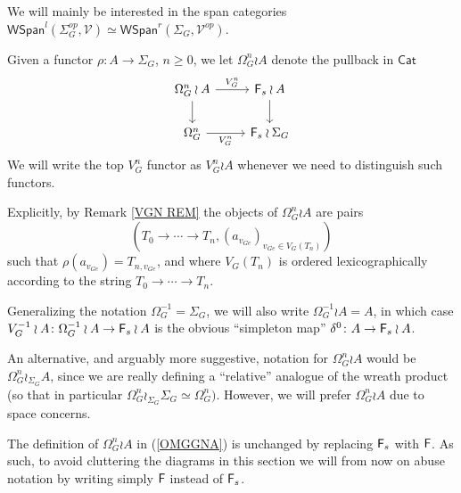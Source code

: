 \documentclass[a4paper,10pt]{article}%
\begin{document}
We will mainly be interested in the span categories 
$\mathsf{WSpan}^l(\Sigma_G^{op},\mathcal{V})\simeq 
\mathsf{WSpan}^r(\Sigma_G,\mathcal{V}^{op})$.


\begin{notation}\label{OMEGAGNA NOT}
	Given a functor $\rho \colon A \to \Sigma_G$, $n \geq 0$, we let $\Omega_G^n \wr A$ denote the pullback in $\mathsf{Cat}$
\begin{equation}\label{OMGGNA}
	\begin{tikzcd}
	\Omega_{G}^n \wr A \ar{r}{V_{G}^{n}} \ar{d}& 
	\Fin_s \wr A \ar{d}
\\
	\Omega_{G}^{n} \ar{r}[swap]{V_{G}^{n}} &
	\Fin_s \wr \Sigma_G
	\end{tikzcd}
\end{equation}
We will write the top $V^n_G$ functor as $V_G^n \wr A$ whenever we need to distinguish such functors.

Explicitly, by Remark \ref{VGN REM}
the objects of $\Omega_{G}^{n} \wr A$ are pairs 
\begin{equation}\label{OMEGAGNA EQ}
(T_0 \to \cdots \to T_n,
(a_{v_{G e}})_{v_{G e} \in V_G(T_n)})
\end{equation}
such that $\rho(a_{v_{G e}}) = T_{n,v_{G e}}$, and
where $V_G(T_n)$ is ordered lexicographically
according to the string $T_0 \to \cdots \to T_n$.
\end{notation}

\begin{remark}
	Generalizing the notation $\Omega_{G}^{-1} = \Sigma_G$, we will also write $\Omega_G^{-1} \wr A  = A$, in which case
	$V_{G}^{-1} \wr A \colon \Omega_G^{-1} \wr A \to \mathsf{F}_s \wr A$
	is the obvious ``simpleton map'' $\delta^0 \colon A \to \mathsf{F}_s \wr A$.
\end{remark}

\begin{remark}
An alternative, and arguably more suggestive, notation for 
$\Omega_{G}^n \wr A$ would be $\Omega_{G}^n \wr_{\Sigma_G} A$,
since we are really defining a ``relative'' analogue of the wreath product 
(so that in particular $\Omega_{G}^n \wr_{\Sigma_G} \Sigma_G \simeq \Omega_G^n)$.
However, we will prefer $\Omega_{G}^n \wr A$ due to space concerns.
\end{remark}

\begin{remark}
The definition of $\Omega_{G}^{n} \wr A$ in (\ref{OMGGNA})
is unchanged by replacing $\mathsf{F}_s$ with $\mathsf{F}$. 
As such, to avoid cluttering the diagrams in this section we will from now on abuse notation by writing simply $\mathsf{F}$ instead of $\mathsf{F}_s$.
\end{remark}
\end{document}
